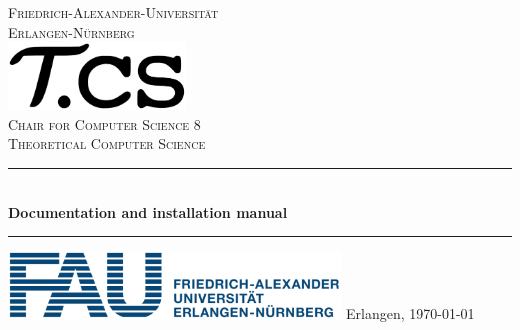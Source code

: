 \begin{titlepage}
\newcommand{\drop}{0.07\textheight}
\begin{center}
\begingroup%
\vfill
{\LARGE\textsc{%
Friedrich-Alexander-Universität\\[2mm]
Erlangen-Nürnberg%
}}\\[\drop]
{%
\includegraphics[height=1.8cm,trim=0cm 0mm 0 0mm]{img/tcs}\\
\textsc{\large Chair for Computer Science 8}\\
\textsc{\large Theoretical Computer Science}}%
\vfill
\rule{\textwidth}{1pt}\par
\vspace{0.5\baselineskip}
{%
  \Huge\bfseries
  \makeatletter
  \@title \\[1cm]
  \makeatother
\large\bfseries
Documentation and installation manual
}\\[0.5\baselineskip]
\rule{\textwidth}{1pt}\par
\vfill
{\Large{\makeatletter\@author\makeatother}
}
\vfill
\includegraphics[height=1.8cm,trim=0cm -5mm 0 0mm]{img/fau}
\vfill
{\large Erlangen, \today}
\endgroup
\end{center}
\end{titlepage}

